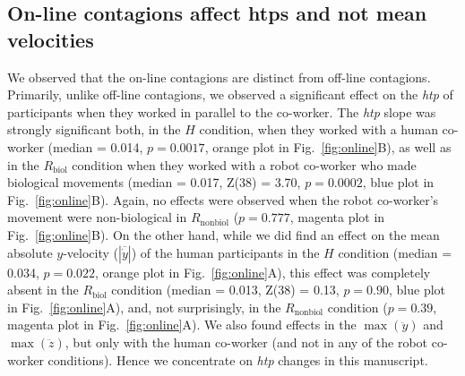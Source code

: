 \documentclass[a4paper, 12pt, oneside]{Thesis}  %
\begin{document}
\subsection{On-line contagions affect htps and not mean velocities}

We observed that the on-line contagions are distinct from off-line contagions. Primarily, unlike off-line contagions, we observed a significant effect on the {\it htp} of participants when they worked in parallel to the co-worker. The {\it htp} slope was strongly significant both, in the $H$ condition, when they worked with a human co-worker (median = 0.014, $p = 0.0017$, orange plot in Fig.~\ref{fig:online}B), as well as in the $R_{\text{biol}}$ condition when they worked with a robot co-worker who made biological movements (median = 0.017, Z(38) = 3.70, $p = 0.0002$, blue plot in Fig.~\ref{fig:online}B). Again, no effects were observed when the robot co-worker's movement were non-biological in $R_{\text{nonbiol}}$ ($p = 0.777$, magenta plot in Fig.~\ref{fig:online}B). On the other hand, while we did find an effect on the mean absolute $y$-velocity ($|\overline{\dot{y}}|$) of the human participants in the $H$ condition (median = 0.034, $p = 0.022$, orange plot in Fig.~\ref{fig:online}A), this effect was completely absent in the $R_{\text{biol}}$ condition (median = 0.013, Z(38) = 0.13, $p = 0.90$, blue plot in Fig.~\ref{fig:online}A), and, not surprisingly, in the $R_{\text{nonbiol}}$ condition ($p = 0.39$, magenta plot in Fig.~\ref{fig:online}A). We also found effects in the $\max(\ddot{y})$ and $\max(\ddot{z})$, but only with the human co-worker (and not in any of the robot co-worker conditions). Hence we concentrate on {\it htp} changes in this manuscript.
\end{document}
